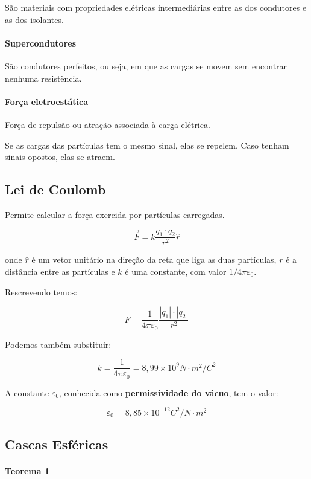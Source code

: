 São materiais com propriedades elétricas intermediárias entre as dos
condutores e as dos isolantes.

\paragraph{Supercondutores}\label{supercondutores}

São condutores perfeitos, ou seja, em que as cargas se movem sem
encontrar nenhuma resistência.

\paragraph{Força eletroestática}\label{foruxe7a-eletroestuxe1tica}

Força de repulsão ou atração associada à carga elétrica.

Se as cargas das partículas tem o mesmo sinal, elas se repelem. Caso
tenham sinais opostos, elas se atraem.

\subsection{Lei de Coulomb}\label{lei-de-coulomb}

Permite calcular a força exercida por partículas carregadas.

\[
\vec{F} = k \frac{q_1 \cdot q_2}{r^2} \hat{r}
\]

onde $\hat{r}$ é um vetor unitário na direção da reta que liga as duas
partículas, $r$ é a distância entre as partículas e $k$ é uma constante,
com valor $1/4 \pi \varepsilon_0$.

Rescrevendo temos:

\[
F = \frac{1}{4 \pi \varepsilon_0} \frac{|q_1| \cdot |q_2|}{r^2}
\]

Podemos também substituir:

\[
k = \frac{1}{4 \pi \varepsilon_0} = 8,99 \times 10^9 N \cdot m^2/C^2
\]

A constante $\varepsilon_0$, conhecida como \textbf{permissividade do
vácuo}, tem o valor:

\[
\varepsilon_0 = 8,85 \times 10^{-12} C^2/N \cdot m^2
\]

\subsection{Cascas Esféricas}\label{cascas-esfuxe9ricas}

\paragraph{Teorema 1}\label{teorema-1-1}

